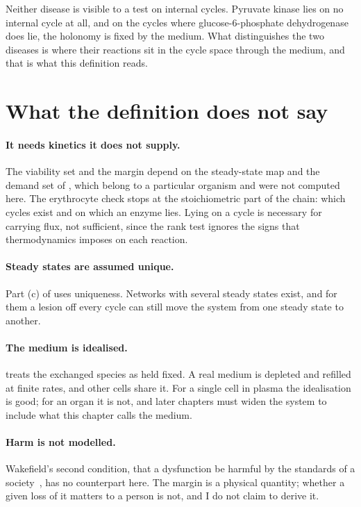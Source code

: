 Neither disease is visible to a test on internal cycles. Pyruvate kinase
lies on no internal cycle at all, and on the cycles where
glucose-6-phosphate dehydrogenase does lie, the holonomy is fixed by the
medium. What distinguishes the two diseases is where their reactions sit in
the cycle space through the medium, and that is what this definition reads.

\section{What the definition does not say}
\label{c1:sec-limits}

\paragraph{It needs kinetics it does not supply.} The viability set and the
margin depend on the steady-state map and the demand set of
, which belong to a particular organism and were not
computed here. The erythrocyte check stops at the stoichiometric part of the
chain: which cycles exist and on which an enzyme lies. Lying on a cycle is
necessary for carrying flux, not sufficient, since the rank test ignores the
signs that thermodynamics imposes on each reaction.

\paragraph{Steady states are assumed unique.} Part (c) of
 uses uniqueness. Networks with several steady states
exist, and for them a lesion off every cycle can still move the system from
one steady state to another.

\paragraph{The medium is idealised.}  treats the
exchanged species as held fixed. A real medium is depleted and refilled at
finite rates, and other cells share it. For a single cell in plasma the
idealisation is good; for an organ it is not, and later chapters must widen
the system to include what this chapter calls the medium.

\paragraph{Harm is not modelled.} Wakefield's second condition, that a
dysfunction be harmful by the standards of a society~\citep{wakefield1992},
has no counterpart here. The margin is a physical quantity; whether a given
loss of it matters to a person is not, and I do not claim to derive it.

